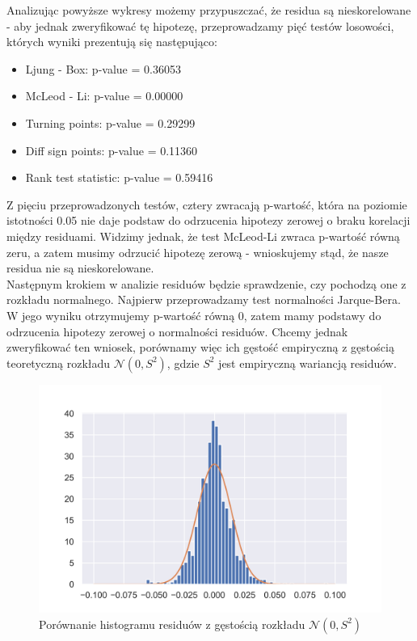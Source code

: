 \documentclass[fleqn]{article}
\theoremstyle{plain}
\begin{document}
    Analizując powyższe wykresy możemy przypuszczać, że residua są nieskorelowane - aby jednak zweryfikować
    tę hipotezę, przeprowadzamy pięć testów losowości, których wyniki prezentują się następująco:\\

    \begin{itemize}
        \item Ljung - Box: p-value = 0.36053
        \item McLeod - Li: p-value = 0.00000
        \item Turning points: p-value = 0.29299
        \item Diff sign points: p-value = 0.11360
        \item Rank test statistic: p-value = 0.59416
    \end{itemize}

    Z pięciu przeprowadzonych testów, cztery zwracają p-wartość, która na poziomie istotności 0.05
    nie daje podstaw do odrzucenia hipotezy zerowej o braku korelacji między residuami. Widzimy jednak, że 
    test McLeod-Li zwraca p-wartość równą zeru, a zatem musimy odrzucić hipotezę zerową  - wnioskujemy stąd, 
    że nasze residua nie są nieskorelowane. \\

    Następnym krokiem w analizie residuów będzie sprawdzenie, czy pochodzą one z rozkładu normalnego. Najpierw przeprowadzamy test normalności Jarque-Bera. 
    W jego wyniku otrzymujemy p-wartość równą 0, zatem mamy podstawy do odrzucenia hipotezy zerowej o normalności 
    residuów. Chcemy jednak zweryfikować ten wniosek, porównamy więc ich gęstość empiryczną z gęstością teoretyczną rozkładu $\mathcal{N}(0, S^2)$, 
    gdzie $S^2$ jest empiryczną wariancją residuów.

    \begin{figure}[H]
        \centering
        \includegraphics[width=1\textwidth]{res_pdf.png}
        \caption{Porównanie histogramu residuów z gęstością rozkładu $\mathcal{N}(0, S^2)$}
        \label{fig:res_pdf}
    \end{figure}
\end{document}

